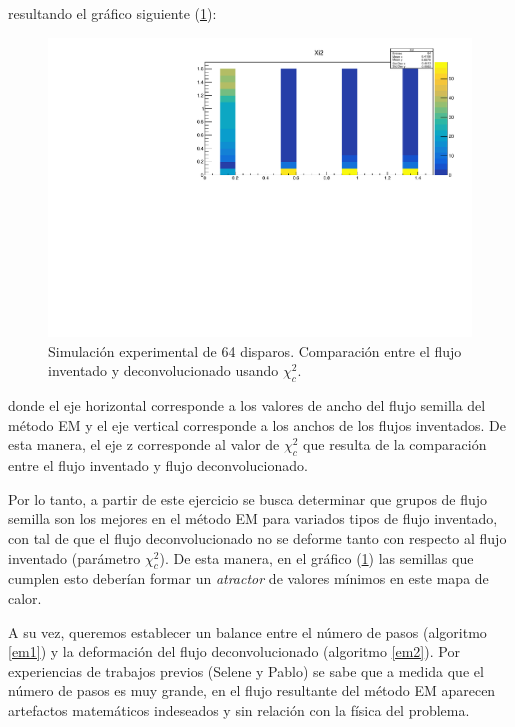 \documentclass[11pt,letterpaper]{article}
\begin{document}
resultando el gráfico siguiente (\ref{1simu_exp}):

\begin{figure}[H]
    \includegraphics[width=1\textwidth]{img/run1_exp_simulation_64shots.pdf}
    \centering
     \cprotect\caption{Simulación experimental de 64 disparos. Comparación entre el flujo inventado y deconvolucionado usando $\chi_c^2$.}
\label{1simu_exp}
\end{figure}

donde el eje horizontal corresponde a los valores de ancho del flujo semilla del método EM y el eje vertical corresponde a los anchos de los flujos inventados. De esta manera, el eje z corresponde al valor de $\chi_c^2$ que resulta de la comparación entre el flujo inventado y flujo deconvolucionado.

Por lo tanto, a partir de este ejercicio se busca determinar que  grupos de flujo semilla son los mejores en el método EM para variados tipos de flujo inventado, con tal de que el flujo deconvolucionado no se deforme tanto con respecto al flujo inventado (parámetro $\chi_c^2$). De esta manera, en el gráfico (\ref{1simu_exp}) las semillas que cumplen esto deberían formar un \textit{atractor} de valores mínimos en este mapa de calor. 

A su vez, queremos establecer un balance entre el número de pasos (algoritmo \ref{em1}) y la deformación del flujo deconvolucionado (algoritmo \ref{em2}). Por experiencias de trabajos previos (Selene y Pablo) se sabe que a medida que el número de pasos es muy grande, en el flujo resultante del método EM aparecen artefactos matemáticos indeseados y sin relación con la física del problema.
\end{document}
